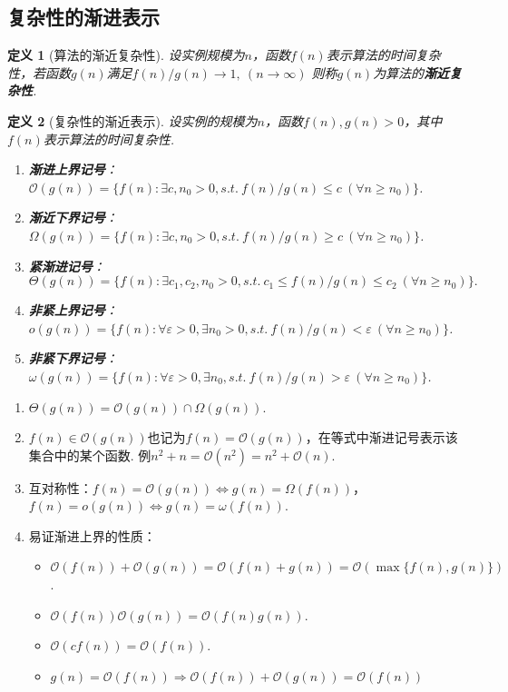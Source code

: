 \documentclass[12pt, a4paper, oneside]{ctexart}
\newtheorem{definition}{定义}[section]
\numberwithin{equation}{section}  %
\theoremstyle{definition}
\newenvironment{remark}{\begin{enumerate}[label=\textbf{注\arabic*.}]}{\end{enumerate}}
\let\leq=\leqslant %
\let\geq=\geqslant %
\def\O{\mathcal{O}}         %
\def\del{\vspace{-1.5ex}}   %
\begin{document}
\subsection{复杂性的渐进表示}
\begin{definition}[算法的渐近复杂性]
    设实例规模为$n$，函数$f(n)$表示算法的时间复杂性，若函数$g(n)$满足$f(n)/g(n)\to 1,\ (n\to\infty)$
    则称$g(n)$为算法的\textbf{渐近复杂性}.
\end{definition}
\begin{definition}[复杂性的渐近表示]设实例的规模为$n$，函数$f(n), g(n)>0$，其中$f(n)$表示算法的时间复杂性.
    \begin{enumerate}
        \item \textbf{渐进上界记号}：$\O(g(n)) = \{f(n):\exists c,n_0>0,s.t.\ f(n)/g(n)\leq c\ (\forall n \geq n_0)\}$.
        \item \textbf{渐近下界记号}：$\Omega(g(n)) = \{f(n):\exists c,n_0>0,s.t.\ f(n)/g(n)\geq c\ (\forall n \geq n_0)\}$.
        \item \textbf{紧渐进记号}：\del
        \begin{equation*}
            \Theta(g(n)) = \{f(n):\exists c_1,c_2,n_0>0,s.t.\ c_1\leq f(n)/g(n)\leq c_2\ (\forall n \geq n_0)\}.
        \end{equation*}
        \item \textbf{非紧上界记号}：$o(g(n)) = \{f(n): \forall \varepsilon > 0, \exists n_0 > 0,s.t.\ f(n)/g(n) < \varepsilon\ (\forall n \geq n_0)\}$.
        \item \textbf{非紧下界记号}：$\omega(g(n)) = \{f(n):\forall \varepsilon > 0, \exists n_0,s.t.\ f(n) / g(n) > \varepsilon\ (\forall n\geq n_0)\}$.
    \end{enumerate}
\end{definition}
\begin{remark}
    \item $\Theta(g(n)) = \O(g(n))\cap \Omega(g(n))$.
    \item $f(n)\in \O(g(n))$也记为$f(n) = \O(g(n))$，在等式中渐进记号表示该集合中的某个函数. 例$n^2+n = \O(n^2) = n^2 + \O(n)$.
    \item 互对称性：$f(n) = \O(g(n))\Leftrightarrow g(n) = \Omega(f(n))$，$f(n)= o(g(n))\Leftrightarrow g(n)= \omega(f(n))$.
    \item 易证渐进上界的性质：
    \begin{itemize}
        \item $\O(f(n)) + \O(g(n)) = \O(f(n)+g(n)) = \O(\max\{f(n),g(n)\})$.
        \item $\O(f(n))\O(g(n)) = \O(f(n)g(n))$.
        \item $\O(cf(n)) = \O(f(n))$.
        \item $g(n) = \O(f(n))\Rightarrow \O(f(n))+\O(g(n)) = \O(f(n))$
    \end{itemize}
\end{remark}
\end{document}
